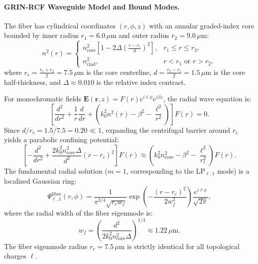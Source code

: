 \documentclass{optica-article}
\begin{document}
\paragraph{GRIN-RCF Waveguide Model and Bound Modes.}
The fiber has cylindrical coordinates $(r, \phi, z)$ with an annular graded-index core bounded by inner radius $r_1 = 6.0\,\mu\text{m}$ and outer radius $r_2 = 9.0\,\mu\text{m}$:
\begin{equation}
n^2(r) = \begin{cases}
n_{\text{core}}^2 \left[ 1 - 2\Delta \left( \frac{r - r_c}{d} \right)^2 \right], & r_1 \le r \le r_2, \\
n_{\text{clad}}^2, & r < r_1 \text{ or } r > r_2,
\end{cases}
\label{eq:rcf_profile}
\end{equation}
where $r_c = \frac{r_1 + r_2}{2} = 7.5\,\mu\text{m}$ is the core centerline, $d = \frac{r_2 - r_1}{2} = 1.5\,\mu\text{m}$ is the core half-thickness, and $\Delta \approx 0.010$ is the relative index contrast.

For monochromatic fields $\mathbf{E}(\mathbf{r}, z) = F(r) e^{i \ell \phi} e^{i \beta z}$, the radial wave equation is:
\begin{equation}
\left[ \frac{d^2}{dr^2} + \frac{1}{r} \frac{d}{dr} + \left( k_0^2 n^2(r) - \beta^2 - \frac{\ell^2}{r^2} \right) \right] F(r) = 0.
\label{eq:radial_wave_rcf}
\end{equation}
Since $d / r_c = 1.5 / 7.5 = 0.20 \ll 1$, expanding the centrifugal barrier around $r_c$ yields a parabolic confining potential:
\begin{equation}
\left[ - \frac{d^2}{dr^2} + \frac{2 k_0^2 n_{\text{core}}^2 \Delta}{d^2} (r - r_c)^2 \right] F(r) \approx \left( k_0^2 n_{\text{core}}^2 - \beta^2 - \frac{\ell^2}{r_c^2} \right) F(r).
\label{eq:radial_parabolic_potential}
\end{equation}
The fundamental radial solution ($m=1$, corresponding to the LP$_{\ell, 1}$ mode) is a localized Gaussian ring:
\begin{equation}
\Psi_{\ell, 1}^{\text{fiber}}(r, \phi) = \frac{1}{\pi^{3/4} \sqrt{r_c w_f}} \exp\left( - \frac{(r - r_c)^2}{2 w_f^2} \right) \frac{e^{i \ell \phi}}{\sqrt{2\pi}},
\label{eq:fiber_eigenmode}
\end{equation}
where the radial width of the fiber eigenmode is:
\begin{equation}
w_f = \left( \frac{d^2}{2 k_0^2 n_{\text{core}}^2 \Delta} \right)^{1/4} \approx 1.22\,\mu\text{m}.
\label{eq:fiber_wf}
\end{equation}
The fiber eigenmode radius $r_c = 7.5\,\mu\text{m}$ is strictly identical for all topological charges $\ell$.
\end{document}
